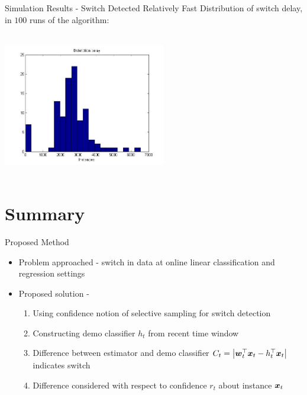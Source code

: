 \documentclass{beamer}
\begin{document}
\begin{frame}{Simulation Results - Switch Detected Relatively Fast}
Distribution of switch delay, in $100$ runs of the algorithm:
\begin{center}
\includegraphics[height=2.5in,width=2.8in]{delay_reg_alg3.jpg}
\end{center}
\end{frame}

\section{Summary}

\begin{frame}{Proposed Method}
\begin{itemize}
\item Problem approached - switch in data at online linear classification and regression settings\newline
\item Proposed solution -\newline
\begin{enumerate}
\item Using confidence notion of selective sampling for switch detection\newline
\item Constructing demo classifier $h_t$ from recent time window\newline
\item Difference between estimator and demo classifier $C_t=\left\vert{{\boldsymbol{w}}}^{\top}_{t}{\boldsymbol{x}}_{t}-h_{t}^{\top}{\boldsymbol{x}}_{t}\right\vert$ indicates switch\newline
\item Difference considered with respect to confidence $r_t$ about instance ${\boldsymbol{x}}_{t}$
\end{enumerate}
\end{itemize}
\end{frame}
\end{document}

